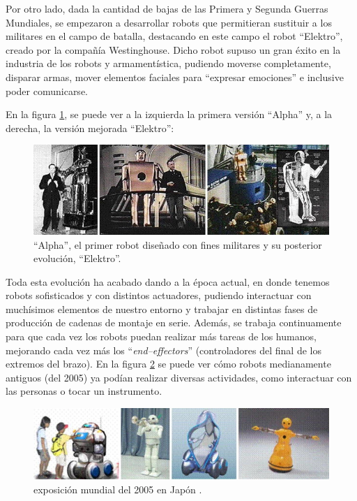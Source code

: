 Por otro lado, dada la cantidad de bajas de las Primera y Segunda Guerras Mundiales, se empezaron a
desarrollar robots que permitieran sustituir a los militares en el campo de batalla, destacando en este
campo el robot ``Elektro'', creado por la compañía Westinghouse. Dicho robot supuso un gran éxito en la
industria de los robots y armamentística, pudiendo moverse completamente, disparar armas, mover elementos
faciales para ``expresar emociones'' e inclusive poder comunicarse.

En la figura \ref{fig:elektro}, se puede ver a la izquierda la primera versión ``Alpha'' y, a la derecha,
la versión mejorada ``Elektro'':

\begin{figure}[H]
    \centering
    \includegraphics[width=.85\linewidth]{pictures/elektro.png}
    \caption{``Alpha'', el primer robot diseñado con fines militares y su posterior evolución, ``Elektro''.}
    \label{fig:elektro}
\end{figure}

Toda esta evolución ha acabado dando a la época actual, en donde tenemos robots sofisticados y con
distintos actuadores, pudiendo interactuar con muchísimos elementos de nuestro entorno y trabajar en
distintas fases de producción de cadenas de montaje en serie. Además, se trabaja continuamente para 
que cada vez los robots puedan realizar más tareas de los humanos, mejorando cada vez más los
``\textit{end--effectors}'' (controladores del final de los extremos del brazo). En la figura 
\ref{fig:new_robots} se puede ver cómo robots medianamente antiguos (del 2005) ya podían realizar diversas
actividades, como interactuar con las personas o tocar un instrumento.

\begin{figure}[H]
    \centering
    \includegraphics[width=.75\linewidth]{pictures/expo_japan.png}
    \caption{exposición mundial del 2005 en Japón \cite{belarmino_j_and_moran_me_and_firoozi_f_and_capello_s_and_kolios_e_and_perrotti_m_oriental_2005}.}
    \label{fig:new_robots}
\end{figure}

